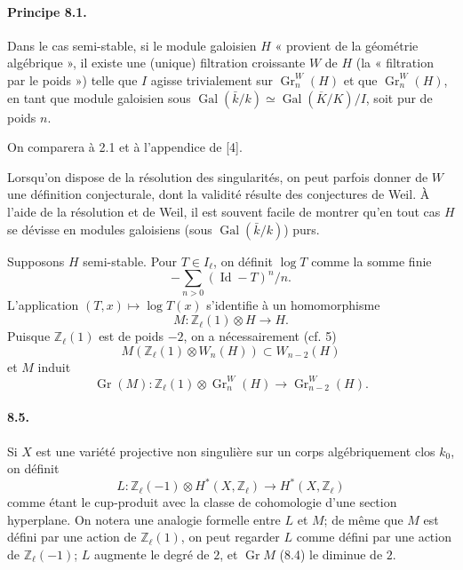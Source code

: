 \documentclass[10pt]{article}
\newcommand{\Zl}{\mathbb Z_\ell}
\newcommand{\Gr}{\operatorname{Gr}}
\newcommand{\Gal}{\operatorname{Gal}}
\newcommand{\Id}{\operatorname{Id}}
\newcommand{\barK}{\overline{K}}
\begin{document}
\paragraph{Principe 8.1.} Dans le cas semi-stable, si le module galoisien $H$ « provient de la géométrie algébrique », il existe une (unique) filtration croissante $W$ de $H$ (la « filtration par le poids ») telle que $I$ agisse trivialement sur $\Gr_n^W(H)$ et que $\Gr_n^W(H)$, en tant que module galoisien sous $\Gal(\bar k/k)\simeq\Gal(\barK/K)/I$, soit pur de poids $n$.

On comparera à 2.1 et à l'appendice de [4].

Lorsqu'on dispose de la résolution des singularités, on peut parfois donner de $W$ une définition conjecturale, dont la validité résulte des conjectures de Weil. À l'aide de la résolution et de Weil, il est souvent facile de montrer qu'en tout cas $H$ se dévisse en modules galoisiens (sous $\Gal(\bar k/k)$) purs.

Supposons $H$ semi-stable. Pour $T\in I_\ell$, on définit $\log T$ comme la somme finie
\[
-\sum_{n>0}(\Id-T)^n/n.
\]
L'application $(T,x)\mapsto\log T(x)$ s'identifie à un homomorphisme
\[
\tag{8.2}
M:\Zl(1)\otimes H\longrightarrow H.
\]
Puisque $\Zl(1)$ est de poids $-2$, on a nécessairement (cf. 5)
\[
\tag{8.3}
M(\Zl(1)\otimes W_n(H))\subset W_{n-2}(H)
\]
et $M$ induit
\[
\tag{8.4}
\Gr(M):\Zl(1)\otimes\Gr_n^W(H)\longrightarrow\Gr_{n-2}^W(H).
\]

\paragraph{8.5.} Si $X$ est une variété projective non singulière sur un corps algébriquement clos $k_0$, on définit
\[
L:\Zl(-1)\otimes H^*(X,\Zl)\longrightarrow H^*(X,\Zl)
\]
comme étant le cup-produit avec la classe de cohomologie d'une section hyperplane. On notera une analogie formelle entre $L$ et $M$; de même que $M$ est défini par une action de $\Zl(1)$, on peut regarder $L$ comme défini par une action de $\Zl(-1)$; $L$ augmente le degré de $2$, et $\Gr M$ (8.4) le diminue de $2$.
\end{document}
